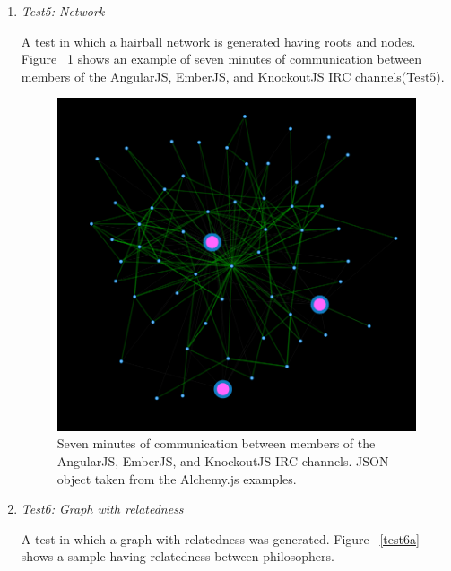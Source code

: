 \begin{enumerate}
\item \textit{Test5: Network}
\par A test in which a hairball network is generated having roots and nodes.  Figure ~\ref{test5} shows an example of seven minutes of communication between members of the AngularJS, EmberJS, and KnockoutJS IRC channels(Test5).

\begin{figure}[H]
\centering
\includegraphics[scale=0.3]{t4.png}
\caption{\label{test5} Seven minutes of communication between members of the AngularJS, EmberJS, and KnockoutJS IRC channels. JSON object taken from the Alchemy.js examples.}
\end{figure}

\item \textit{Test6: Graph with relatedness}
\par A test in which a graph with relatedness was generated. Figure ~\ref{test6a} shows a sample having relatedness between philosophers.


\end{enumerate}
